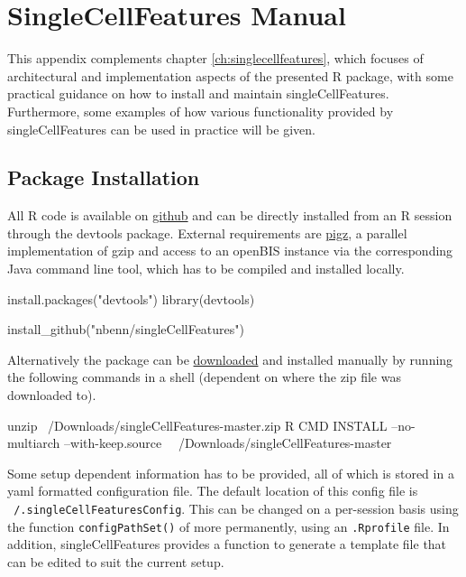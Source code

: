 \chapter{SingleCellFeatures Manual}
\label{ch:scf-manual}

This appendix complements chapter \ref{ch:singlecellfeatures}, which focuses of architectural and implementation aspects of the presented R package, with some practical guidance on how to install and maintain singleCellFeatures. Furthermore, some examples of how various functionality provided by singleCellFeatures can be used in practice will be given.

\section{Package Installation}
All R code is available on \href{https://github.com/nbenn/singleCellFeatures}{github} and can be directly installed from an R session through the devtools package. External requirements are \href{http://zlib.net/pigz/}{pigz}, a parallel implementation of gzip and access to an openBIS \citep{Bauch2011} instance via the corresponding Java command line tool, which has to be compiled and installed locally.

\begin{rflow}
install.packages("devtools")
library(devtools)

install_github("nbenn/singleCellFeatures")
\end{rflow}

Alternatively the package can be \href{https://github.com/nbenn/singleCellFeatures/archive/master.zip}{downloaded} and installed manually by running the following commands in a shell (dependent on where the zip file was downloaded to).

\begin{bashflow}
unzip ~/Downloads/singleCellFeatures-master.zip
R CMD INSTALL --no-multiarch --with-keep.source \
  ~/Downloads/singleCellFeatures-master
\end{bashflow}

Some setup dependent information has to be provided, all of which is stored in a yaml formatted configuration file. The default location of this config file is \texttt{~/.singleCellFeaturesConfig}. This can be changed on a per-session basis using the function \texttt{configPathSet()} of more permanently, using an \texttt{.Rprofile} file. In addition, singleCellFeatures provides a function to generate a template file that can be edited to suit the current setup.

